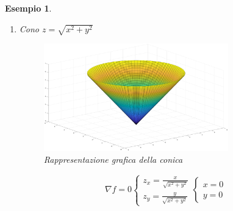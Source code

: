 \documentclass{book}
\newtheorem{esempio}{Esempio}
\begin{document}
\begin{esempio}
\begin{enumerate}
	  \item Cono $z=\sqrt{x^2+y^2}$ 
		\begin{figure}[ht]
			\centering
			\includegraphics[width=8cm]{img/finiti/cono.eps}
			\caption{Rappresentazione grafica della conica}
			\label{fig:conica}
		\end{figure}
		\begin{equation*}
			\nabla f=0
			\begin{cases}
				z_x=\frac{x}{\sqrt{x^2+y^2}}\\
				z_y=\frac{y}{\sqrt{x^2+y^2}}
			\end{cases}\begin{cases}
					x=0\\
					y=0
			\end{cases} 
		\end{equation*}
  \end{enumerate}
\end{esempio}
    
\printindex
\end{document}
